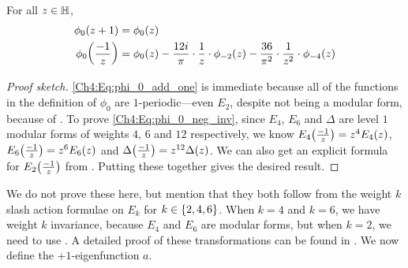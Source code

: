 \begin{boxlemma}\label{Ch4:Lemma:phi_transformations}
    For all $z \in \mathbb{H}$,
    \begin{align}
        \phi_0\!\left( z + 1 \right)
        &= \phi_0\!\left( z \right)
        \label{Ch4:Eq:phi_0_add_one} \\
        \phi_0\!\left( \frac{-1}{z} \right)
        &= \phi_0\!\left( z \right)
        - \frac{12 i}{\pi} \cdot \frac{1}{z} \cdot \phi_{-2}\!\left( z \right)
        - \frac{36}{\pi^2} \cdot \frac{1}{z^2} \cdot \phi_{-4}\!\left( z \right)
        \label{Ch4:Eq:phi_0_neg_inv}
    \end{align}
\end{boxlemma}
\begin{proof}[Proof sketch]
    \eqref{Ch4:Eq:phi_0_add_one} is immediate because all of the functions in the definition of $\phi_0$ are $1$-periodic---even $E_2$, despite not being a modular form, because of . To prove \eqref{Ch4:Eq:phi_0_neg_inv}, since $E_4$, $E_6$ and $\Delta$ are level $1$ modular forms of weights $4$, $6$ and $12$ respectively, we know $E_4\!\left( \frac{-1}{z} \right) = z^4 E_4\!\left( z \right)$, $E_6\!\left( \frac{-1}{z} \right) = z^6 E_6\!\left( z \right)$ and $\Delta\!\left( \frac{-1}{z} \right) = z^{12} \Delta\!\left( z \right)$. We can also get an explicit formula for $E_2\!\left( \frac{-1}{z} \right)$ from . Putting these together gives the desired result.
\end{proof}

We do not prove these here, but mention that they both follow from the weight $k$ slash action formulae on $E_k$ for $k \in \left\{ 2, 4, 6 \right\}$. When $k = 4$ and $k = 6$, we have weight $k$ invariance, because $E_4$ and $E_6$ are modular forms, but when $k = 2$, we need to use . A detailed proof of these transformations can be found in \cite{blueprint}. We now define the $+1$-eigenfunction $a$.

